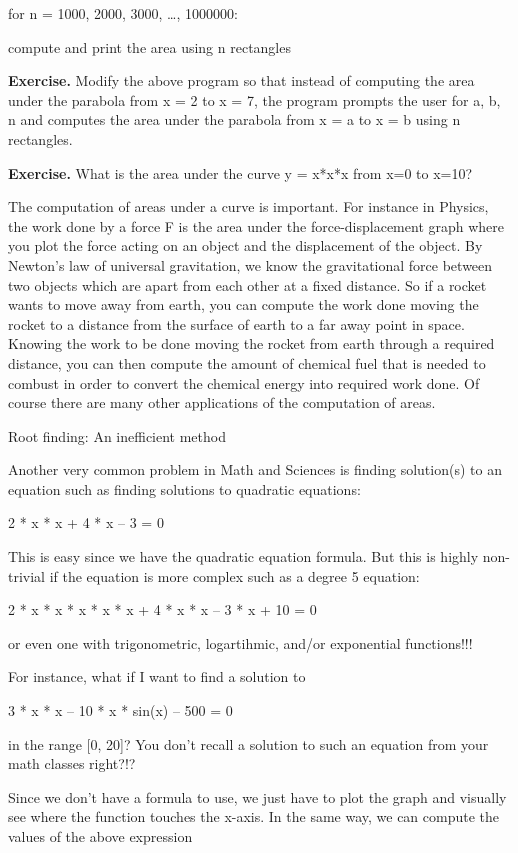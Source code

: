 \documentclass[
]{article}
\begin{document}
for n = 1000, 2000, 3000, \ldots, 1000000:

compute and print the area using n rectangles

\textbf{Exercise.} Modify the above program so that instead of computing
the area under the parabola from x = 2 to x = 7, the program prompts the
user for a, b, n and computes the area under the parabola from x = a to
x = b using n rectangles.

\textbf{Exercise.} What is the area under the curve y = x*x*x from x=0
to x=10?

The computation of areas under a curve is important. For instance in
Physics, the work done by a force F is the area under the
force-displacement graph where you plot the force acting on an object
and the displacement of the object. By Newton's law of universal
gravitation, we know the gravitational force between two objects which
are apart from each other at a fixed distance. So if a rocket wants to
move away from earth, you can compute the work done moving the rocket to
a distance from the surface of earth to a far away point in space.
Knowing the work to be done moving the rocket from earth through a
required distance, you can then compute the amount of chemical fuel that
is needed to combust in order to convert the chemical energy into
required work done. Of course there are many other applications of the
computation of areas.

Root finding: An inefficient method

Another very common problem in Math and Sciences is finding solution(s)
to an equation such as finding solutions to quadratic equations:

2 * x * x + 4 * x -- 3 = 0

This is easy since we have the quadratic equation formula. But this is
highly non-trivial if the equation is more complex such as a degree 5
equation:

2 * x * x * x * x * x + 4 * x * x -- 3 * x + 10 = 0

or even one with trigonometric, logartihmic, and/or exponential
functions!!!

For instance, what if I want to find a solution to

3 * x * x -- 10 * x * sin(x) -- 500 = 0

in the range {[}0, 20{]}? You don't recall a solution to such an
equation from your math classes right?!?

Since we don't have a formula to use, we just have to plot the graph and
visually see where the function touches the x-axis. In the same way, we
can compute the values of the above expression
\end{document}
